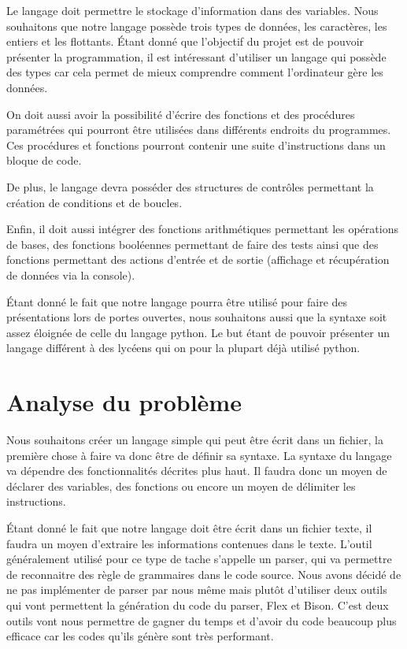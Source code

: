 \documentclass[a4paper]{article}%
\begin{document}
Le langage doit permettre le stockage d'information dans des variables. Nous
souhaitons que notre langage possède trois types de données, les caractères, les
entiers et les flottants. Étant donné que l'objectif du projet est de pouvoir
présenter la programmation, il est intéressant d'utiliser un langage qui possède
des types car cela permet de mieux comprendre comment l'ordinateur gère les
données.

On doit aussi avoir la possibilité d'écrire des fonctions et des procédures
paramétrées qui pourront être utilisées dans différents endroits du programmes.
Ces procédures et fonctions pourront contenir une suite d'instructions dans un
bloque de code.

De plus, le langage devra posséder des structures de contrôles permettant la
création de conditions et de boucles.

Enfin, il doit aussi intégrer des fonctions arithmétiques permettant les
opérations de bases, des fonctions booléennes permettant de faire des
tests ainsi que des fonctions permettant des actions d'entrée et de sortie
(affichage et récupération de données via la console).

Étant donné le fait que notre langage pourra être utilisé pour faire des
présentations lors de portes ouvertes, nous souhaitons aussi que la syntaxe soit
assez éloignée de celle du langage python. Le but étant de pouvoir présenter
un langage différent à des lycéens qui on pour la plupart déjà utilisé python.

\section{Analyse du problème}

Nous souhaitons créer un langage simple qui peut être écrit dans un fichier, la
première chose à faire va donc être de définir sa syntaxe. La syntaxe du langage
va dépendre des fonctionnalités décrites plus haut. Il faudra donc un moyen de
déclarer des variables, des fonctions ou encore un moyen de délimiter les
instructions.

Étant donné le fait que notre langage doit être écrit dans un fichier texte, il
faudra un moyen d'extraire les informations contenues dans le texte. L'outil
généralement utilisé pour ce type de tache s'appelle un \gls{parser}, qui va
permettre de reconnaitre des règle de grammaires dans le code source. Nous avons
décidé de ne pas implémenter de \gls{parser} par nous même mais plutôt d'utiliser
deux outils qui vont permettent la génération du code du \gls{parser}, Flex et Bison.
C'est deux outils vont nous permettre de gagner du temps et d'avoir du code
beaucoup plus efficace car les codes qu'ils génère sont très performant.
\end{document}
